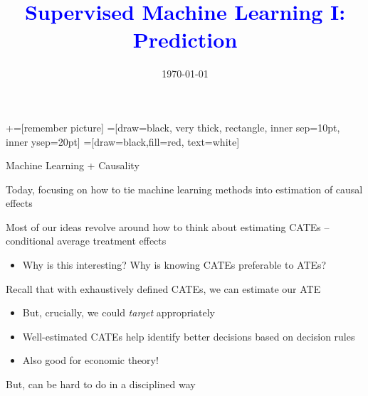 \documentclass[notes,11pt, aspectratio=169]{beamer}
\title[]{\textcolor{blue}{Supervised Machine Learning I: Prediction}} \author[PGP]{}
\institute[FRBNY]{\small{\begin{tabular}{c}
                           Paul Goldsmith-Pinkham  \\
\end{tabular}}}
\date{\today}
\newenvironment{wideitemize}{\itemize\addtolength{\itemsep}{10pt}}{\enditemize}
\begin{document}
\newcommand\marktopleft[1]{%
    \tikz[overlay,remember picture] 
        \node (marker-#1-a) at (-.3em,.3em) {};%
}
\newcommand\markbottomright[2]{%
    \tikz[overlay,remember picture] 
        \node (marker-#1-b) at (0em,0em) {};%
}
+=[remember picture] 
 =[draw=black, very thick, rectangle, inner sep=10pt, inner ysep=20pt]
 =[draw=black,fill=red, text=white]

\begin{frame}
\maketitle
\end{frame}

\begin{frame}{Machine Learning + Causality}
  \begin{wideitemize}
  \item Today, focusing on how to tie machine learning methods into estimation of causal effects
  \item Most of our ideas revolve around how to think about estimating CATEs -- conditional average treatment effects
    \begin{itemize}
    \item Why is this interesting? Why is knowing CATEs preferable to ATEs?
    \end{itemize}
  \item Recall that with exhaustively defined CATEs, we can estimate our ATE
    \begin{itemize}
    \item But, crucially, we could \emph{target} appropriately
    \item Well-estimated CATEs help identify better decisions based on decision rules
    \item Also good for economic theory!      
    \end{itemize}
  \item But, can be hard to do in a disciplined way
  \end{wideitemize}
\end{frame}
\end{document}

